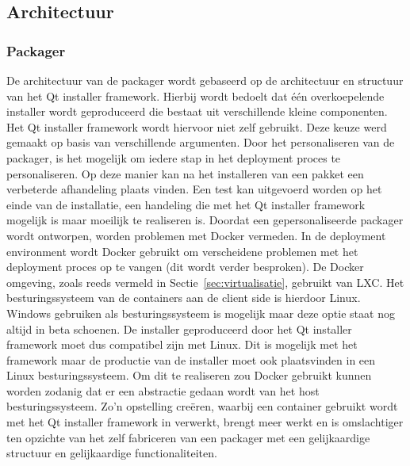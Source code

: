\subsection{Architectuur}

\subsubsection{Packager}
De architectuur van de packager wordt gebaseerd op de architectuur en structuur van het Qt installer framework.
Hierbij wordt bedoelt dat één overkoepelende installer wordt geproduceerd die bestaat uit verschillende kleine componenten.
Het Qt installer framework wordt hiervoor niet zelf gebruikt.
Deze keuze werd gemaakt op basis van verschillende argumenten.
Door het personaliseren van de packager, is het mogelijk om iedere stap in het deployment proces te personaliseren.
Op deze manier kan na het installeren van een pakket een verbeterde afhandeling plaats vinden.
Een test kan uitgevoerd worden op het einde van de installatie, een handeling die met het Qt installer framework mogelijk is maar moeilijk te realiseren is.
Doordat een gepersonaliseerde packager wordt ontworpen, worden problemen met Docker vermeden.
In de deployment environment wordt Docker gebruikt om verscheidene problemen met het deployment proces op te vangen (dit wordt verder besproken).
De Docker omgeving, zoals reeds vermeld in Sectie~\vref{sec:virtualisatie}, gebruikt van LXC.
Het besturingssysteem van de containers aan de client side is hierdoor Linux.
Windows gebruiken als besturingssysteem is mogelijk maar deze optie staat nog altijd in beta schoenen.
De installer geproduceerd door het Qt installer framework moet dus compatibel zijn met Linux.
Dit is mogelijk met het framework maar de productie van de installer moet ook plaatsvinden in een Linux besturingssysteem.
Om dit te realiseren zou Docker gebruikt kunnen worden zodanig dat er een abstractie gedaan wordt van het host besturingssysteem.
Zo'n opstelling creëren, waarbij een container gebruikt wordt met het Qt installer framework in verwerkt, brengt meer werkt en is omslachtiger ten opzichte van het zelf fabriceren van een packager met een gelijkaardige structuur en gelijkaardige functionaliteiten.

